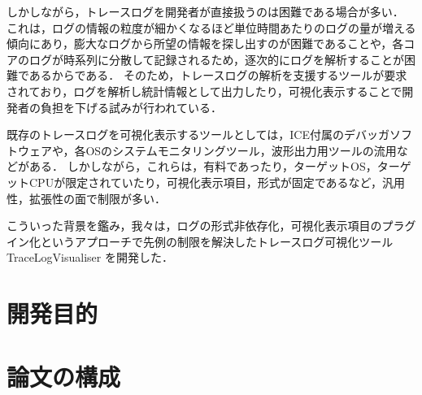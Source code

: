 しかしながら，トレースログを開発者が直接扱うのは困難である場合が多い．
これは，ログの情報の粒度が細かくなるほど単位時間あたりのログの量が増える傾向にあり，膨大なログから所望の情報を探し出すのが困難であることや，各コアのログが時系列に分散して記録されるため，逐次的にログを解析することが困難であるからである．
そのため，トレースログの解析を支援するツールが要求されており，ログを解析し統計情報として出力したり，可視化表示することで開発者の負担を下げる試みが行われている．

既存のトレースログを可視化表示するツールとしては，ICE付属のデバッガソフトウェアや，各OSのシステムモニタリングツール，波形出力用ツールの流用などがある．
しかしながら，これらは，有料であったり，ターゲットOS，ターゲットCPUが限定されていたり，可視化表示項目，形式が固定であるなど，汎用性，拡張性の面で制限が多い．

こういった背景を鑑み，我々は，ログの形式非依存化，可視化表示項目のプラグイン化というアプローチで先例の制限を解決したトレースログ可視化ツール TraceLogVisualiser を開発した．

\section{開発目的}

\section{論文の構成}
